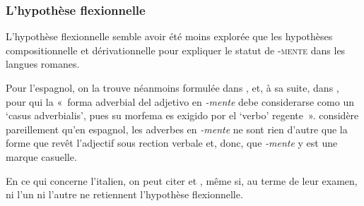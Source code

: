 \documentclass[output=paper]{langsci/langscibook}
\begin{document}

\subsubsection{L'hypothèse flexionnelle}\label{section:dal:2.1.4}

L'hypothèse flexionnelle semble avoir été moins explorée que les hypothèses compositionnelle et dérivationnelle pour expliquer le statut de -\textsc{mente} dans les langues romanes.

Pour l'espagnol, on la trouve néanmoins formulée dans %
\citet{Hjelmslev28}%
%
, et, à sa suite, dans %
\citet[85]{Alarcos51}%
%
, pour qui la «~forma adverbial del adjetivo en \emph{-mente} debe considerarse como un `casus adverbialis', pues su morfema es exigido por el `verbo' regente~». %
\citet{Pottier66} %
%
considère pareillement qu'en espagnol, les adverbes en \emph{-mente} ne sont rien d'autre que la forme que revêt l'adjectif sous rection verbale et, donc, que \emph{-mente} y est une marque casuelle.

En ce qui concerne l'italien, on peut citer %
\citet{Scalise90} %
%
et %
\citet{Ricca98,Ricca04}%
%
, même si, au terme de leur examen, ni l'un ni l'autre ne retiennent l'hypothèse flexionnelle.
\end{document}
